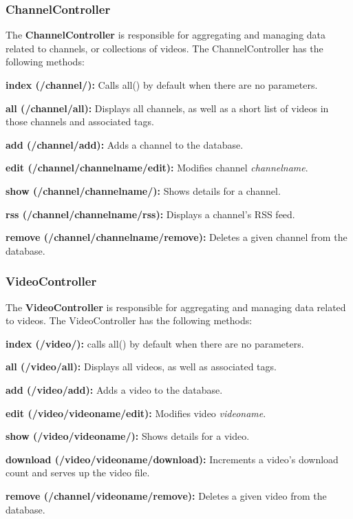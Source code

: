 \documentclass[a4paper,12pt]{report}
\begin{document}
\subsubsection{ChannelController}
The \textbf{ChannelController} is responsible for aggregating and managing data related to channels, or collections of videos. The ChannelController has the following methods:
\begin{description}
\item{\textbf{index (/channel/): } Calls all() by default when there are no parameters.}
\item{\textbf{all (/channel/all): } Displays all channels, as well as a short list of videos in those channels and associated tags.}
\item{\textbf{add (/channel/add): } Adds a channel to the database.}
\item{\textbf{edit (/channel/channelname/edit): } Modifies channel \textit{channelname}.}
\item{\textbf{show (/channel/channelname/): } Shows details for a channel.}
\item{\textbf{rss (/channel/channelname/rss): } Displays a channel's RSS feed.}
\item{\textbf{remove (/channel/channelname/remove): } Deletes a given channel from the database.} \\
\end{description} 

\subsubsection{VideoController}
The \textbf{VideoController} is responsible for aggregating and managing data related to videos. The VideoController has the following methods:
\begin{description}
\item{\textbf{index (/video/): } calls all() by default when there are no parameters.}
\item{\textbf{all (/video/all): } Displays all videos, as well as associated tags.}
\item{\textbf{add (/video/add): } Adds a video to the database.}
\item{\textbf{edit (/video/videoname/edit): } Modifies video \textit{videoname}.}
\item{\textbf{show (/video/videoname/): } Shows details for a video.}
\item{\textbf{download (/video/videoname/download): } Increments a video's download count and serves up the video file.}
\item{\textbf{remove (/channel/videoname/remove): } Deletes a given video from the database.} \\
\end{description} 
\end{document}
